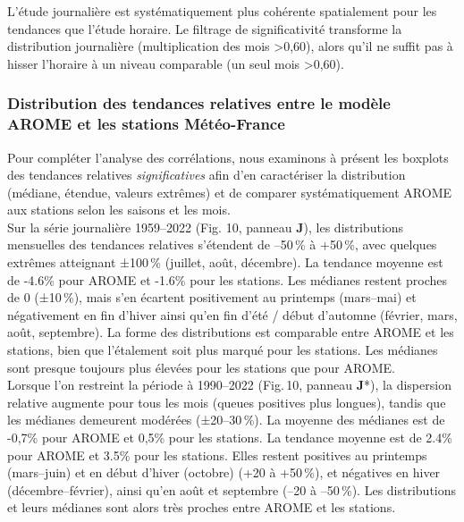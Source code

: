 \documentclass[
  article,
  nofooter,
  noheadings]{jss}
\begin{document}
L'étude journalière est systématiquement plus cohérente spatialement
pour les tendances que l'étude horaire. Le filtrage de significativité
transforme la distribution journalière (multiplication des mois
\textgreater0,60), alors qu'il ne suffit pas à hisser l'horaire à un
niveau comparable (un seul mois \textgreater0,60).

\subsubsection{Distribution des tendances relatives entre le modèle
AROME et les stations
Météo-France}\label{distribution-des-tendances-relatives-entre-le-moduxe8le-arome-et-les-stations-muxe9tuxe9o-france}

Pour compléter l'analyse des corrélations, nous examinons à présent les
boxplots des tendances relatives \emph{significatives} afin d'en
caractériser la distribution (médiane, étendue, valeurs extrêmes) et de
comparer systématiquement AROME aux stations selon les saisons et les
mois.\\

Sur la série journalière 1959--2022 (Fig. 10, panneau \textbf{J}), les
distributions mensuelles des tendances relatives s'étendent de --50\,\%
à +50\,\%, avec quelques extrêmes atteignant ±100\,\% (juillet, août,
décembre). La tendance moyenne est de -4.6\% pour AROME et -1.6\% pour
les stations. Les médianes restent proches de 0 (±10\,\%), mais s'en
écartent positivement au printemps (mars--mai) et négativement en fin
d'hiver ainsi qu'en fin d'été / début d'automne (février, mars, août,
septembre). La forme des distributions est comparable entre AROME et les
stations, bien que l'étalement soit plus marqué pour les stations. Les
médianes sont presque toujours plus élevées pour les stations que pour
AROME.\\

Lorsque l'on restreint la période à 1990--2022 (Fig.\,10, panneau
\textbf{J}*), la dispersion relative augmente pour tous les mois (queues
positives plus longues), tandis que les médianes demeurent modérées
(±20--30\,\%). La moyenne des médianes est de -0,7\% pour AROME et 0,5\%
pour les stations. La tendance moyenne est de 2.4\% pour AROME et 3.5\%
pour les stations. Elles restent positives au printemps (mars--juin) et
en début d'hiver (octobre) (+20 à +50\,\%), et négatives en hiver
(décembre--février), ainsi qu'en août et septembre (--20 à --50\,\%).
Les distributions et leurs médianes sont alors très proches entre AROME
et les stations.\\
\end{document}
